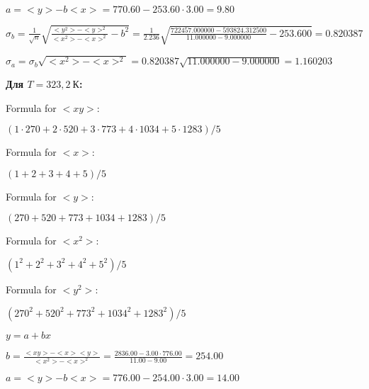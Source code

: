 \documentclass[12pt,a4paper]{article}
\begin{document}
$a =<y> - b<x> = 770.60 - 253.60 \cdot 3.00 = 9.80$
\vspace{0.5cm}

$\sigma_b = \frac{1}{\sqrt{n}} \sqrt { \frac{<y^2> - <y>^2}{<x^2> - <x>^2}  - b^2} = \frac{1}{2.236} \sqrt {\frac{722457.000000 - 593824.312500}{11.000000 - 9.000000} - 253.600} = 0.820387$
\vspace{0.5cm}

$\sigma_a = \sigma_b \sqrt{<x^2> - <x>^2} = 0.820387 \sqrt{11.000000 - 9.000000} = 1.160203$
\vspace{0.5cm}




\textbf{Для $T = 323,2 \: \textit{К}$:}
\vspace{0.5cm}




Formula for $<xy>:$
\vspace{0.5cm}

$(1 \cdot 270 + 2 \cdot 520 + 3 \cdot 773 + 4 \cdot 1034 + 5 \cdot 1283) / 5$
\vspace{0.5cm}

Formula for $<x>:$
\vspace{0.5cm}

$(1 + 2 + 3 + 4 + 5) / 5$
\vspace{0.5cm}

Formula for $<y>:$
\vspace{0.5cm}

$(270 + 520 + 773 + 1034 + 1283) / 5$
\vspace{0.5cm}

Formula for $<x^2>$:
\vspace{0.5cm}

$(1^2 + 2^2 + 3^2 + 4^2 + 5^2) / 5$
\vspace{0.5cm}

Formula for $<y^2>:$
\vspace{0.5cm}

$(270^2 + 520^2 + 773^2 + 1034^2 + 1283^2) / 5$
\vspace{0.5cm}



$y = a + bx$
\vspace{0.5cm}

$b = \frac{<xy> - <x><y>}{<x^2> - <x>^2} = \frac{2836.00 - 3.00 \cdot 776.00}{11.00 - 9.00} = 254.00$
\vspace{0.5cm}

$a =<y> - b<x> = 776.00 - 254.00 \cdot 3.00 = 14.00$
\vspace{0.5cm}
\end{document}
